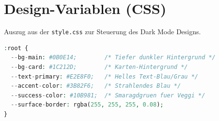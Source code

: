 \documentclass[11pt,
a4paper,
numbers=nonperiod,
footsepline,
oneside,
numbers=noenddot,
bibliography=totoc
]{scrreprt}
\begin{document}
\section{Design-Variablen (CSS)}
Auszug aus der \texttt{style.css} zur Steuerung des Dark Mode Designs.
\begin{lstlisting}[language=PHP]
:root {
  --bg-main: #0B0E14;        /* Tiefer dunkler Hintergrund */
  --bg-card: #1C212D;        /* Karten-Hintergrund */
  --text-primary: #E2E8F0;   /* Helles Text-Blau/Grau */
  --accent-color: #3B82F6;   /* Strahlendes Blau */
  --success-color: #10B981;  /* Smaragdgruen fuer Veggi */
  --surface-border: rgba(255, 255, 255, 0.08);
}
\end{lstlisting}
\end{document}

